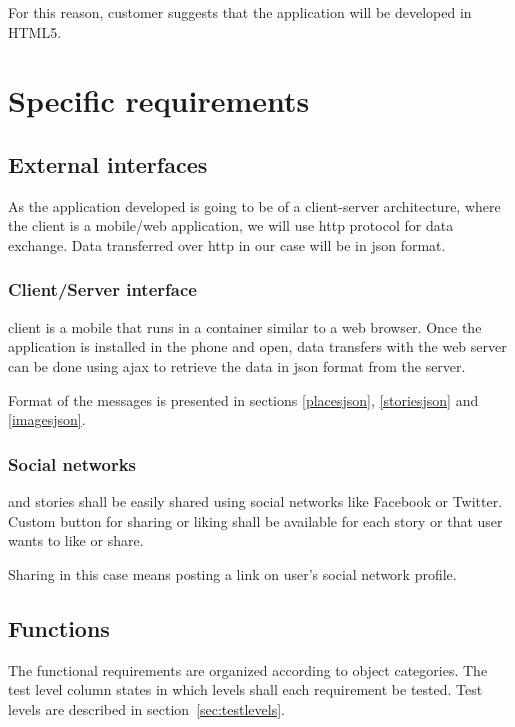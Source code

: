 \documentclass[11pt]{book}
\begin{document}
For this reason, customer suggests that the application will be developed in HTML5.

\section{Specific requirements}\label{sec:req_specific_requirements}

\subsection{External interfaces}
As the application developed is going to be of a client-server architecture, where the client is a mobile/web application, we will use \gls{http} protocol for data exchange. Data transferred over \gls{http} in our case will be in \gls{json} format.

\subsubsection{\systemname Client/Server interface}
\systemname client is a mobile that runs in a container similar to a web browser. Once the application is installed in the phone and open, data transfers with the web server can be done using \gls{ajax} to retrieve the data in \gls{json} format from the server.

Format of the messages is presented in sections \ref{placesjson}, \ref{storiesjson} and \ref{imagesjson}.

\subsubsection{Social networks}\label{sec:req_social_networks}
\wallentitypcap and stories shall be easily shared using social networks like Facebook or Twitter. Custom button for sharing or liking shall be available for each story or \wallentitys that user wants to like or share.

Sharing in this case means posting a link on user's social network profile.

\subsection{Functions}\label{sec:functionalreq}
The functional requirements are organized according to object categories. The test level column states in which levels shall each requirement be tested. Test levels are described in section~\ref{sec:testlevels}.
\end{document}
